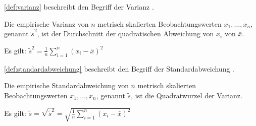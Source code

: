 \autoref{def:varianz} beschreibt den Begriff der Varianz
\autocite[vgl.][S.399]{CorrelationBetweenRelatives}.
\begin{definition}
    Die empirische Varianz von $n$ metrisch skalierten Beobachtungswerten $x_1,
    \dots, x_n$, genannt $\tilde{s}^2$, ist der Durchschnitt der quadratischen
    Abweichung von $x_i$ von $\bar{x}$.

    Es gilt: $\tilde{s}^2 = \frac{1}{n} \displaystyle\sum^{n}_{i=1}(x_i - \bar{x})^2 $
    \label{def:varianz}
\end{definition}

\autoref{def:standardabweichung} beschreibt den Begriff der Standardabweichung
\autocite[vgl.][S.80]{ContributionsToTheMathematicalTheory}.
\begin{definition}
    Die empirische Standardabweichung von $n$ metrisch skalierten Beobachtungswerten $x_1,
    \dots, x_n$, genannt $\tilde{s}$, ist die Quadratwurzel der Varianz.

    Es gilt: $\tilde{s} = \sqrt{\tilde{s}^2} = \sqrt{\frac{1}{n}
    \displaystyle\sum^{n}_{i=1}(x_i - \bar{x})^2} $
    \label{def:standardabweichung}
\end{definition}

